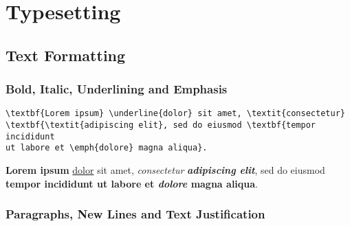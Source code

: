 \chapter*{Typesetting}
\label{ch:typesetting}

\section*{Text Formatting}
\label{sec:text-formatting}

\subsection*{Bold, Italic, Underlining and Emphasis}
\label{subsec:bold-italic-underlining-and-emphasis}

\begin{lstlisting}[caption={Bold, italic, underlining and emphasis.}]
\textbf{Lorem ipsum} \underline{dolor} sit amet, \textit{consectetur}
\textbf{\textit{adipiscing elit}, sed do eiusmod \textbf{tempor incididunt
ut labore et \emph{dolore} magna aliqua}.
\end{lstlisting}

\textbf{Lorem ipsum} \underline{dolor} sit amet, \textit{consectetur}
\textbf{\textit{adipiscing elit}}, sed do eiusmod \textbf{tempor incididunt
ut labore et \emph{dolore} magna aliqua}.

\subsection*{Paragraphs, New Lines and Text Justification}
\label{subsec:paragraphs-new-lines-and-text-justification}

